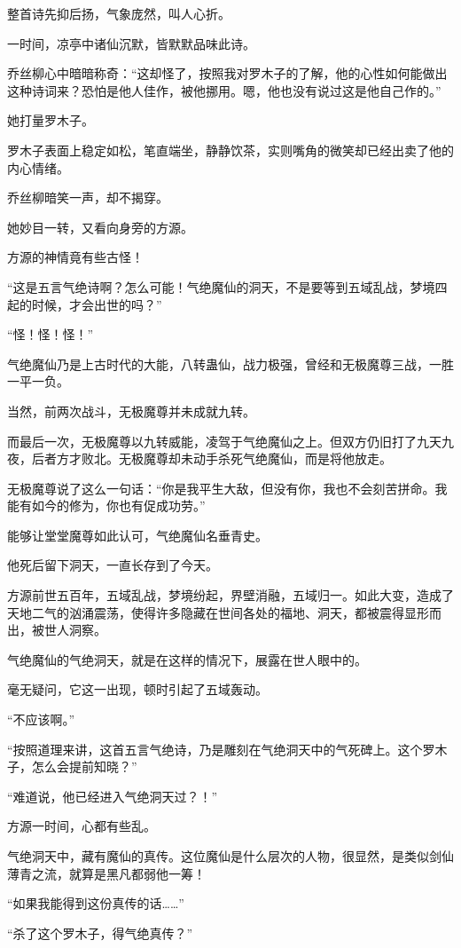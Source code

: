 \begin{this_body}
整首诗先抑后扬，气象庞然，叫人心折。

一时间，凉亭中诸仙沉默，皆默默品味此诗。

乔丝柳心中暗暗称奇：“这却怪了，按照我对罗木子的了解，他的心性如何能做出这种诗词来？恐怕是他人佳作，被他挪用。嗯，他也没有说过这是他自己作的。”

她打量罗木子。

罗木子表面上稳定如松，笔直端坐，静静饮茶，实则嘴角的微笑却已经出卖了他的内心情绪。

乔丝柳暗笑一声，却不揭穿。

她妙目一转，又看向身旁的方源。

方源的神情竟有些古怪！

“这是五言气绝诗啊？怎么可能！气绝魔仙的洞天，不是要等到五域乱战，梦境四起的时候，才会出世的吗？”

“怪！怪！怪！”

气绝魔仙乃是上古时代的大能，八转蛊仙，战力极强，曾经和无极魔尊三战，一胜一平一负。

当然，前两次战斗，无极魔尊并未成就九转。

而最后一次，无极魔尊以九转威能，凌驾于气绝魔仙之上。但双方仍旧打了九天九夜，后者方才败北。无极魔尊却未动手杀死气绝魔仙，而是将他放走。

无极魔尊说了这么一句话：“你是我平生大敌，但没有你，我也不会刻苦拼命。我能有如今的修为，你也有促成功劳。”

能够让堂堂魔尊如此认可，气绝魔仙名垂青史。

他死后留下洞天，一直长存到了今天。

方源前世五百年，五域乱战，梦境纷起，界壁消融，五域归一。如此大变，造成了天地二气的汹涌震荡，使得许多隐藏在世间各处的福地、洞天，都被震得显形而出，被世人洞察。

气绝魔仙的气绝洞天，就是在这样的情况下，展露在世人眼中的。

毫无疑问，它这一出现，顿时引起了五域轰动。

“不应该啊。”

“按照道理来讲，这首五言气绝诗，乃是雕刻在气绝洞天中的气死碑上。这个罗木子，怎么会提前知晓？”

“难道说，他已经进入气绝洞天过？！”

方源一时间，心都有些乱。

气绝洞天中，藏有魔仙的真传。这位魔仙是什么层次的人物，很显然，是类似剑仙薄青之流，就算是黑凡都弱他一筹！

“如果我能得到这份真传的话……”

“杀了这个罗木子，得气绝真传？”


\end{this_body}
